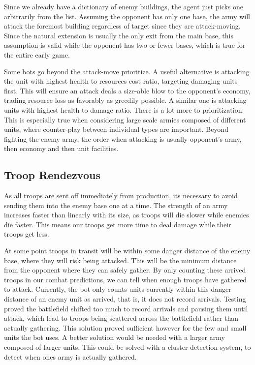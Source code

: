	Since we already have a dictionary of enemy buildings, the agent just picks one arbitrarily from the list. Assuming the opponent has only one base, the army will attack the foremost building regardless of target since they are attack-moving. Since the natural extension is usually the only exit from the main base, this assumption is valid while the opponent has two or fewer bases, which is true for the entire early game.
	
	Some bots go beyond the attack-move prioritize. A useful alternative is attacking the unit with highest health to resources cost ratio, targeting damaging units first. This will ensure an attack deals a size-able blow to the opponent's economy, trading resource loss as favorably as greedily possible. A similar one is attacking units with highest health to damage ratio. There is a lot more to prioritization. This is especially true when considering large scale armies composed of different units, where counter-play between individual types are important. Beyond fighting the enemy army, the order when attacking is usually opponent's army, then economy and then unit facilities.
	
	\subsection*{Troop Rendezvous}
	As all troops are sent off immediately from production, its necessary to avoid sending them into the enemy base one at a time. The strength of an army increases faster than linearly with its size, as troops will die slower while enemies die faster. This means our troops get more time to deal damage while their troops get less.
	
	At some point troops in transit will be within some danger distance of the enemy base, where they will risk being attacked. This will be the minimum distance from the opponent where they can safely gather. By only counting these arrived troops in our combat predictions, we can tell when enough troops have gathered to attack. Currently, the bot only counts units currently within this danger distance of an enemy unit as arrived, that is, it does not record arrivals. Testing proved the battlefield shifted too much to record arrivals and pausing them until attack, which lead to troops being scattered across the battlefield rather than actually gathering. This solution proved sufficient however for the few and small units the bot uses. A better solution would be needed with a larger army composed of larger units. This could be solved with a cluster detection system, to detect when ones army is actually gathered.
	
